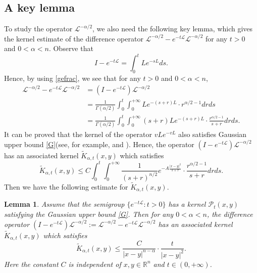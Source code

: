\documentclass[10pt, reqno]{amsart}
\newtheorem{lemma}[theorem]{Lemma}
\theoremstyle{definition}
\theoremstyle{remark}
\numberwithin{equation}{section}
\begin{document}
\subsection{A key lemma}
To study the operator $\mathcal{L}^{-\alpha/2}$, we also need the following key lemma, which gives the kernel estimate of the difference operator $\mathcal{L}^{-\alpha/2}-e^{-t\mathcal L}\mathcal{L}^{-\alpha/2}$ for any $t>0$ and $0<\alpha<n$. Observe that
\begin{equation*}
I-e^{-t\mathcal L}=\int_0^{t}Le^{-sL}ds.
\end{equation*}
Hence, by using \eqref{gefrac}, we see that for any $t>0$ and $0<\alpha<n$,
\begin{equation*}
\begin{split}
\mathcal{L}^{-\alpha/2}-e^{-t\mathcal L}\mathcal{L}^{-\alpha/2}&=(I-e^{-t\mathcal L})\mathcal{L}^{-\alpha/2}\\
&=\frac{1}{\Gamma(\alpha/2)}\int_0^{t}\int_0^{+\infty}Le^{-(s+r)L}\cdot r^{\alpha/2-1}drds\\
&=\frac{1}{\Gamma(\alpha/2)}\int_0^{t}\int_0^{+\infty}(s+r)Le^{-(s+r)L}\cdot\frac{r^{\alpha/2-1}}{s+r}drds.
\end{split}
\end{equation*}
It can be proved that the kernel of the operator $vLe^{-vL}$ also satisfies Gaussian upper bound \eqref{G}(see, for example, \cite{deng} and \cite{d}). Hence, the operator $(I-e^{-t\mathcal L})\mathcal{L}^{-\alpha/2}$ has an associated kernel $\widetilde{K}_{\alpha,t}(x,y)$ which satisfies
\begin{equation*}
\widetilde{K}_{\alpha,t}(x,y)\leq C\int_0^{t}\int_0^{+\infty}\frac{1}{(s+r)^{n/2}}e^{-A\frac{|x-y|^2}{s+r}}\cdot\frac{r^{\alpha/2-1}}{s+r}drds.
\end{equation*}
Then we have the following estimate for $\widetilde{K}_{\alpha,t}(x,y)$.
\begin{lemma}\label{wanglemma2}
Assume that the semigroup $\big\{e^{-t\mathcal L}:t>0\big\}$ has a kernel $\mathcal{P}_t(x,y)$ satisfying the Gaussian upper bound \eqref{G}.
Then for any $0<\alpha<n$, the difference operator $(I-e^{-t\mathcal L})\mathcal{L}^{-\alpha/2}:=\mathcal{L}^{-\alpha/2}-e^{-t\mathcal L}\mathcal{L}^{-\alpha/2}$ has an associated kernel $\widetilde{K}_{\alpha,t}(x,y)$ which satisfies
\begin{equation*}
\widetilde{K}_{\alpha,t}(x,y)\leq\frac{C}{|x-y|^{n-\alpha}}\cdot\frac{t}{|x-y|^2}.
\end{equation*}
Here the constant $C$ is independent of $x,y\in\mathbb R^n$ and $t\in(0,+\infty)$.
\end{lemma}
\end{document}
